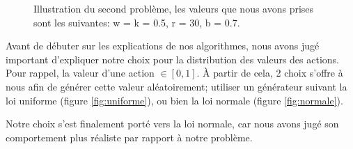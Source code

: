 \documentclass[pdftex,french, english]{article}	%
\begin{document}
    \begin{figure}[H]
	\centering
		\caption{Illustration du second problème, les valeurs que nous avons prises sont les suivantes: w = k = 0.5, r = 30, b = 0.7.} \label{fig:probleme2}
	\end{figure}

Avant de débuter sur les explications de nos algorithmes, nous avons jugé important d'expliquer notre choix pour la distribution des valeurs des actions.
Pour rappel, la valeur d'une action $\in [0, 1]$. À partir de cela, 2 choix s'offre à nous afin de générer cette valeur aléatoirement; utiliser un générateur suivant la loi uniforme (figure \ref{fig:uniforme}), ou bien la loi normale (figure \ref{fig:normale}). 

Notre choix s'est finalement porté vers la loi normale, car nous avons jugé son comportement plus réaliste par rapport à notre problème. 
\end{document}

